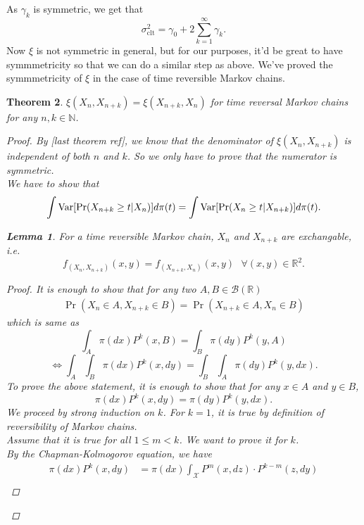 \documentclass{article}
\newtheorem{theorem}{Theorem}[section]
\newtheorem{lemma}[theorem]{Lemma}
\begin{document}
	As $\gamma_k$ is symmetric, we get that
	$$\sigma_{\text{clt}}^2 = \gamma_0 + 2\sum_{k=1}^{\infty} \gamma_k.$$
	Now $\xi$ is not symmetric in general, but for our purposes, it'd be great to have symmmetricity so that we can do a similar step as above.
	We've proved the symmmetricity of $\xi$ in the case of time reversible Markov chains.

	\begin{theorem}
		$\xi(X_n, X_{n+k}) = \xi(X_{n+k}, X_n)$ for time reversal Markov chains for any $n, k \in \mathbb{N}$.
		\begin{proof}
			By [last theorem ref], we know that the denominator of $\xi(X_n, X_{n+k})$ is independent of both $n$ and $k$. So we only have to prove that the numerator is symmetric. \\
			We have to show that
			\begin{equation*}
				\int \text{Var} [\Pr (X_{n+k} \geq t | X_n)] d\pi(t) = \int \text{Var} [\Pr (X_n \geq t | X_{n+k})] d\pi(t).
			\end{equation*}
			\begin{lemma}
				For a time reversible Markov chain, $X_n$ and $X_{n+k}$ are exchangable, i.e.
				\begin{equation*}
					f_{(X_{n}, X_{n+k})}(x, y) = f_{(X_{n+k}, X_{n})}(x, y) \text{  } \forall (x, y) \in \mathbb{R}^2.
				\end{equation*}
				\begin{proof}
					It is enough to show that for any two $A, B \in \mathcal{B}(\mathbb{R})$
					\begin{align*}
						\Pr(X_n \in A, X_{n+k} \in B) = \Pr(X_{n+k} \in A, X_{n} \in B)
					\end{align*}
					which is same as
						$$\int_A \pi(dx) P^k(x, B) = \int_B \pi(dy) P^k(y, A)$$
						$$\Longleftrightarrow\int_A \int_B \pi(dx) P^k(x, dy) = \int_B \int_A \pi(dy) P^k(y, dx).$$
					To prove the above statement, it is enough to show that for any $x \in A$ and $y \in B$,
					$$\pi(dx) P^k(x, dy) = \pi(dy) P^k(y, dx).$$
					We proceed by strong induction on $k$.
					For $k = 1$, it is true by definition of reversibility of Markov chains.\\
					Assume that it is true for all $1 \leq m < k$.
					We want to prove it for $k$.\\
					By the Chapman-Kolmogorov equation, we have
					\begin{align*}
						\pi(dx) P^k(x, dy) &= \pi(dx) \int_{\mathcal{X}} P^m(x, dz)\cdot P^{k-m}(z, dy)\\

\end{align*}
\end{proof}
\end{lemma}
\end{proof}
\end{theorem}
\end{document}
